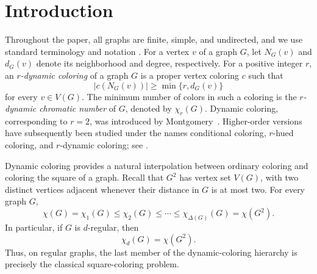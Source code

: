 \documentclass[10pt,a4paper]{article}
\theoremstyle{case}
\numberwithin{subcase}{case}
\begin{document}
\begin{abstract}
An $r$-dynamic coloring of a graph $G$ is a proper vertex coloring in
which every vertex $v$ sees at least $\min\{r,d(v)\}$ distinct colors
in its neighborhood. 
The minimum number of colors in such a
coloring is the $r$-dynamic chromatic number $\chi_r(G)$.
We study dynamic colorings of regular graphs. A straighforward observation shows that  $\chi_r(G)=\chi(G^2)$, for any $r$-regular graph $G$.
We prove that
$
\chi_3(G)=\chi(G^2)\le6
$
for every claw-free cubic graph $G$, and the bound is sharp.
For Hamiltonian claw-free cubic graphs, we improve the bound to $5$
apart from four explicit exceptions.
We also determine exactly the $r$-dynamic chromatic number of the
$4$-regular circulant graph $C_p(1,3)$ for each
$r\in\{2,3,4\}$. In particular, the case $r=4$ determines
$\chi(C^2_p(1,3))$.
\end{abstract}
\section{Introduction}

Throughout the paper, all graphs are finite, simple, and undirected,
and we use standard terminology and notation
\cite{bondy_graph_2008,diestel_graph_2017}.
For a vertex $v$ of a graph $G$, let $N_G(v)$ and $d_G(v)$ denote its
neighborhood and degree, respectively.
For a positive integer $r$, an \emph{$r$-dynamic coloring} of a graph
$G$ is a proper vertex coloring $c$ such that
\[
|c(N_G(v))|\ge \min\{r,d_G(v)\}
\]
for every $v\in V(G)$. The minimum number of colors in such a coloring
is the \emph{$r$-dynamic chromatic number} of $G$, denoted by
$\chi_r(G)$. Dynamic coloring, corresponding to $r=2$, was introduced
by Montgomery~\cite{montgomery2001dynamic}. Higher-order versions have
subsequently been studied under the names conditional coloring,
$r$-hued coloring, and $r$-dynamic coloring; see
\cite{CHEN202224,LAI20061997}.

Dynamic coloring provides a natural interpolation between ordinary
coloring and coloring the square of a graph. Recall that $G^2$ has
vertex set $V(G)$, with two distinct vertices adjacent whenever their
distance in $G$ is at most two. For every graph $G$,
\begin{equation}\label{eq:absolute-bounds}
\chi(G)=\chi_1(G)
\le \chi_2(G)
\le\cdots\le
\chi_{\Delta(G)}(G)
=\chi(G^2).
\end{equation}
In particular, if $G$ is $d$-regular, then
\begin{equation}\label{eq:regular-square}
\chi_d(G)=\chi(G^2).
\end{equation}
Thus, on regular graphs, the last member of the dynamic-coloring
hierarchy is precisely the classical square-coloring problem.
\end{document}
